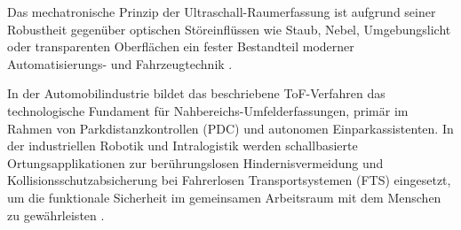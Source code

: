 	Das mechatronische Prinzip der Ultraschall-Raumerfassung ist aufgrund seiner Robustheit gegenüber optischen Störeinflüssen wie Staub, Nebel, Umgebungslicht oder transparenten Oberflächen ein fester Bestandteil moderner Automatisierungs- und Fahrzeugtechnik \cite{Fraden:2010}. 
	
	In der Automobilindustrie bildet das beschriebene ToF-Verfahren das technologische Fundament für Nahbereichs-Umfelderfassungen, primär im Rahmen von Parkdistanzkontrollen (PDC) und autonomen Einparkassistenten. In der industriellen Robotik und Intralogistik werden schallbasierte Ortungsapplikationen zur berührungslosen Hindernisvermeidung und Kollisionsschutzabsicherung bei Fahrerlosen Transportsystemen (FTS) eingesetzt, um die funktionale Sicherheit im gemeinsamen Arbeitsraum mit dem Menschen zu gewährleisten \cite{Klemenz:2019}.
